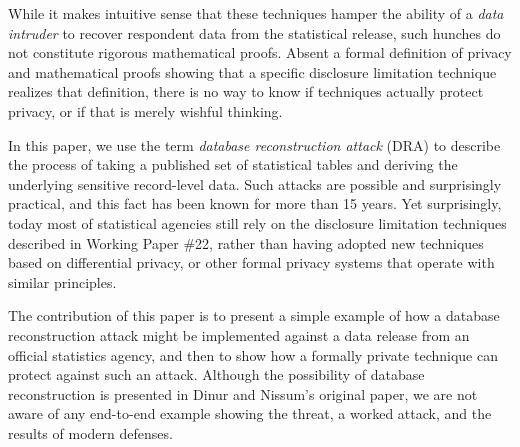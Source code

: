 While it makes intuitive sense that these techniques hamper the
ability of a  \emph{data intruder} to recover respondent data from the
statistical release, such hunches do not constitute rigorous
mathematical proofs. Absent a formal definition of privacy and
mathematical proofs showing that a specific disclosure limitation
technique realizes that definition, there is no way to know if
techniques actually protect privacy, or if that is merely wishful thinking.

In this paper, we use
the term \emph{database reconstruction attack} (DRA) to describe the process of
taking a published set of statistical tables and deriving the
underlying sensitive record-level data. Such attacks are possible and surprisingly
practical, and this fact has been known for more than 15
years\cite{noise}. Yet surprisingly, today most of
statistical agencies still rely on the disclosure
limitation techniques described in Working Paper \#22, rather than
having adopted new techniques based on differential
privacy\cite{Dwork:2006:CNS:2180286.2180305}, or other formal privacy systems 
that operate with similar principles\cite{KiferMachanavajjhala:2012}.

The contribution of this paper is to present a simple example of how
a database reconstruction attack might be implemented against a data
release from an official statistics agency, and then to show how a
formally private technique can protect against such an
attack. Although the possibility of database reconstruction is
presented in Dinur and Nissum's original paper\cite{noise}, we are not
aware of any \iflongversion end-to-end \fi example showing the threat, a worked attack,
and the results of modern defenses.

